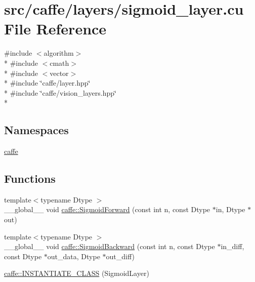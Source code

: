 \hypertarget{sigmoid__layer_8cu}{\section{src/caffe/layers/sigmoid\+\_\+layer.cu File Reference}
\label{sigmoid__layer_8cu}
}
{\ttfamily \#include $<$algorithm$>$}\\*
{\ttfamily \#include $<$cmath$>$}\\*
{\ttfamily \#include $<$vector$>$}\\*
{\ttfamily \#include \char`\"{}caffe/layer.\+hpp\char`\"{}}\\*
{\ttfamily \#include \char`\"{}caffe/vision\+\_\+layers.\+hpp\char`\"{}}\\*
\subsection*{Namespaces}
\begin{DoxyCompactItemize}
\item 
 \hyperlink{namespacecaffe}{caffe}
\end{DoxyCompactItemize}
\subsection*{Functions}
\begin{DoxyCompactItemize}
\item 
{\footnotesize template$<$typename Dtype $>$ }\\\+\_\+\+\_\+global\+\_\+\+\_\+ void \hyperlink{namespacecaffe_a630ac77e09451de2f8b1e06905be90a7}{caffe\+::\+Sigmoid\+Forward} (const int n, const Dtype $\ast$in, Dtype $\ast$out)
\item 
{\footnotesize template$<$typename Dtype $>$ }\\\+\_\+\+\_\+global\+\_\+\+\_\+ void \hyperlink{namespacecaffe_a0da539f774d82bac493b76b0232d7a0d}{caffe\+::\+Sigmoid\+Backward} (const int n, const Dtype $\ast$in\+\_\+diff, const Dtype $\ast$out\+\_\+data, Dtype $\ast$out\+\_\+diff)
\item 
\hyperlink{namespacecaffe_ae153024d4b24c9c45f986ae3974cc6b7}{caffe\+::\+I\+N\+S\+T\+A\+N\+T\+I\+A\+T\+E\+\_\+\+C\+L\+A\+S\+S} (Sigmoid\+Layer)
\end{DoxyCompactItemize}

